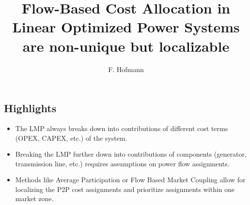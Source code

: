 \documentclass[11pt,twocolumn]{article}
\begin{document}
\title{Flow-Based Cost Allocation in Linear Optimized Power Systems are non-unique but localizable}
\author{F. Hofmann}

\maketitle

\begin{abstract}
\end{abstract}





\subsection*{Highlights}
\begin{itemize}
 \item The LMP always breaks down into contributions of different cost terms (OPEX, CAPEX, etc.) of the system.
 \item Breaking the LMP further down into contributions of components (generator, transmission line, etc.) requires assumptions on power flow assignments.
 \item Methods like Average Participation or Flow Based Market Coupling allow for localizing the P2P cost assignments and prioritize assignments within one market zone.
\end{itemize}


\end{document}
